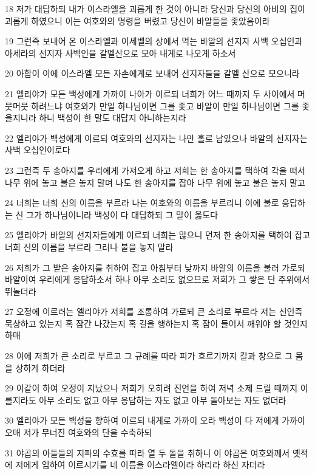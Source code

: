 \par 18 저가 대답하되 내가 이스라엘을 괴롭게 한 것이 아니라 당신과 당신의 아비의 집이 괴롭게 하였으니 이는 여호와의 명령을 버렸고 당신이 바알들을 좇았음이라
\par 19 그런즉 보내어 온 이스라엘과 이세벨의 상에서 먹는 바알의 선지자 사백 오십인과 아세라의 선지자 사백인을 갈멜산으로 모아 내게로 나오게 하소서
\par 20 아합이 이에 이스라엘 모든 자손에게로 보내어 선지자들을 갈멜 산으로 모으니라
\par 21 엘리야가 모든 백성에게 가까이 나아가 이르되 너희가 어느 때까지 두 사이에서 머뭇머뭇 하려느냐 여호와가 만일 하나님이면 그를 좇고 바알이 만일 하나님이면 그를 좇을지니라 하니 백성이 한 말도 대답지 아니하는지라
\par 22 엘리야가 백성에게 이르되 여호와의 선지자는 나만 홀로 남았으나 바알의 선지자는 사백 오십인이로다
\par 23 그런즉 두 송아지를 우리에게 가져오게 하고 저희는 한 송아지를 택하여 각을 떠서 나무 위에 놓고 불은 놓지 말며 나도 한 송아지를 잡아 나무 위에 놓고 불은 놓지 말고
\par 24 너희는 너희 신의 이름을 부르라 나는 여호와의 이름을 부르리니 이에 불로 응답하는 신 그가 하나님이니라 백성이 다 대답하되 그 말이 옳도다
\par 25 엘리야가 바알의 선지자들에게 이르되 너희는 많으니 먼저 한 송아지를 택하여 잡고 너희 신의 이름을 부르라 그러나 불을 놓지 말라
\par 26 저희가 그 받은 송아지를 취하여 잡고 아침부터 낮까지 바알의 이름을 불러 가로되 바알이여 우리에게 응답하소서 하나 아무 소리도 없으므로 저희가 그 쌓은 단 주위에서 뛰놀더라
\par 27 오정에 이르러는 엘리야가 저희를 조롱하여 가로되 큰 소리로 부르라 저는 신인즉 묵상하고 있는지 혹 잠간 나갔는지 혹 길을 행하는지 혹 잠이 들어서 깨워야 할 것인지 하매
\par 28 이에 저희가 큰 소리로 부르고 그 규례를 따라 피가 흐르기까지 칼과 창으로 그 몸을 상하게 하더라
\par 29 이같이 하여 오정이 지났으나 저희가 오히려 진언을 하여 저녁 소제 드릴 때까지 이를지라도 아무 소리도 없고 아무 응답하는 자도 없고 아무 돌아보는 자도 없더라
\par 30 엘리야가 모든 백성을 향하여 이르되 내게로 가까이 오라 백성이 다 저에게 가까이 오매 저가 무너진 여호와의 단을 수축하되
\par 31 야곱의 아들들의 지파의 수효를 따라 열 두 돌을 취하니 이 야곱은 여호와께서 옛적에 저에게 임하여 이르시기를 네 이름을 이스라엘이라 하리라 하신 자더라
